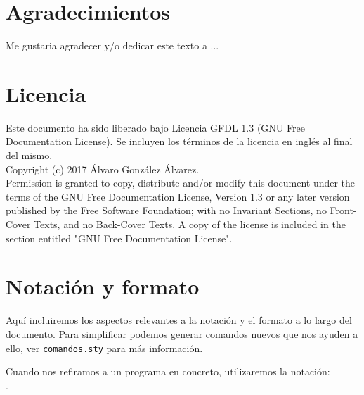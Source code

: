 

\section*{Agradecimientos}

Me gustaria agradecer y/o dedicar este texto a ...

\cleardoublepage

\section*{Licencia} %

Este documento ha sido liberado bajo Licencia GFDL 1.3 (GNU Free
Documentation License). Se incluyen los términos de la licencia en
inglés al final del mismo.\\

Copyright (c) 2017 Álvaro González Álvarez.\\

Permission is granted to copy, distribute and/or modify this document under the
terms of the GNU Free Documentation License, Version 1.3 or any later version
published by the Free Software Foundation; with no Invariant Sections, no
Front-Cover Texts, and no Back-Cover Texts. A copy of the license is included in
the section entitled "GNU Free Documentation License".\\

\cleardoublepage

\section*{Notación y formato}

Aquí incluiremos los aspectos relevantes a la notación y el formato a
lo largo del documento. Para simplificar podemos generar comandos
nuevos que nos ayuden a ello, ver \texttt{comandos.sty} para más
información. 

Cuando nos refiramos a un programa en concreto, utilizaremos la
notación: \\ .\\

